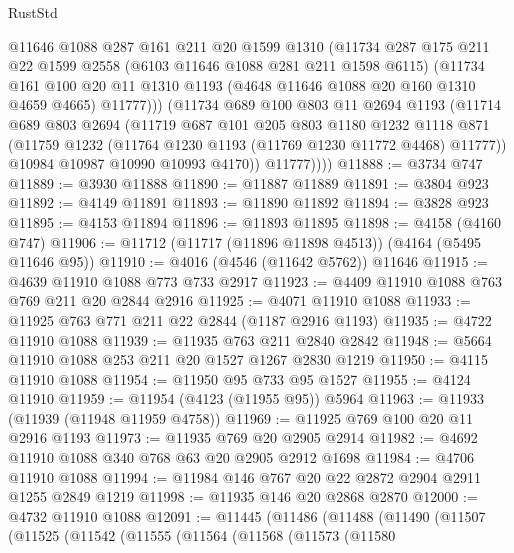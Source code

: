 \begin{lexlean}{RustStd}
\begin{coremodule}
            @11646
            @1088
            @287
            @161
            @211
            @20
            @1599
            @1310
            (@11734
              @287
              @175
              @211
              @22
              @1599
              @2558
              (@6103 @11646 @1088 @281 @211 @1598 @6115)
              (@11734
                @161
                @100
                @20
                @11
                @1310
                @1193
                (@4648 @11646 @1088 @20 @160 @1310 @4659 @4665)
                @11777)))
          (@11734
            @689
            @100
            @803
            @11
            @2694
            @1193
            (@11714
              @689
              @803
              @2694
              (@11719
                @687
                @101
                @205
                @803
                @1180
                @1232
                @1118
                @871
                (@11759 @1232 (@11764 @1230 @1193 (@11769 @1230 @11772 @4468) @11777))
                @10984
                @10987
                @10990
                @10993
                @4170))
            @11777))))
@11888 := @3734 @747
@11889 := @3930 @11888
@11890 := @11887 @11889
@11891 := @3804 @923
@11892 := @4149 @11891
@11893 := @11890 @11892
@11894 := @3828 @923
@11895 := @4153 @11894
@11896 := @11893 @11895
@11898 := @4158 (@4160 @747)
@11906 := @11712 (@11717 (@11896 @11898 @4513)) (@4164 (@5495 @11646 @95))
@11910 := @4016 (@4546 (@11642 @5762)) @11646
@11915 := @4639 @11910 @1088 @773 @733 @2917
@11923 := @4409 @11910 @1088 @763 @769 @211 @20 @2844 @2916
@11925 := @4071 @11910 @1088
@11933 := @11925 @763 @771 @211 @22 @2844 (@1187 @2916 @1193)
@11935 := @4722 @11910 @1088
@11939 := @11935 @763 @211 @2840 @2842
@11948 := @5664 @11910 @1088 @253 @211 @20 @1527 @1267 @2830 @1219
@11950 := @4115 @11910 @1088
@11954 := @11950 @95 @733 @95 @1527
@11955 := @4124 @11910
@11959 := @11954 (@4123 (@11955 @95)) @5964
@11963 := @11933 (@11939 (@11948 @11959 @4758))
@11969 := @11925 @769 @100 @20 @11 @2916 @1193
@11973 := @11935 @769 @20 @2905 @2914
@11982 := @4692 @11910 @1088 @340 @768 @63 @20 @2905 @2912 @1698
@11984 := @4706 @11910 @1088
@11994 := @11984 @146 @767 @20 @22 @2872 @2904 @2911 @1255 @2849 @1219
@11998 := @11935 @146 @20 @2868 @2870
@12000 := @4732 @11910 @1088
@12091 := @11445
    (@11486
      (@11488
        (@11490
          (@11507
            (@11525
              (@11542
                (@11555
                  (@11564
                    (@11568
                      (@11573
                        (@11580

\end{coremodule}
\end{lexlean}
